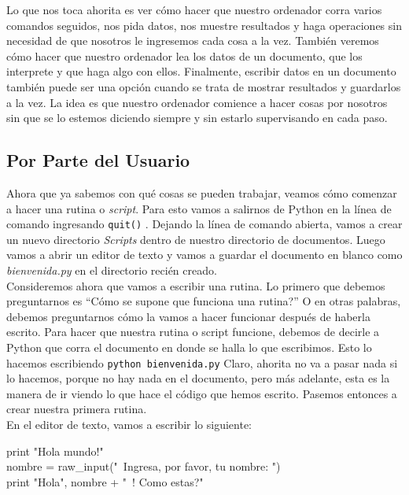 \documentclass[10pt,letterpaper]{article}
\newcommand{\inlinecode}[1]{
\colorbox{light-gray}{\texttt{#1}}
}
\newenvironment{Code}
{
\begin{lrbox}{\selvestebox}%
\begin{minipage}{\dimexpr\columnwidth-2\fboxsep\relax}
\fontfamily{\ttdefault}\selectfont
}
{\end{minipage}\end{lrbox}%
\begin{center}
\colorbox{light-gray}{\usebox{\selvestebox}}
\end{center}
}
\begin{document}
Lo que nos toca ahorita es ver c\'omo hacer que nuestro ordenador corra varios comandos seguidos, nos pida datos, nos muestre resultados y haga operaciones sin necesidad de que nosotros le ingresemos cada cosa a la vez. Tambi\'en veremos c\'omo hacer que nuestro ordenador lea los datos de un documento, que los interprete y que haga algo con ellos. Finalmente, escribir datos en un documento tambi\'en puede ser una opci\'on cuando se trata de mostrar resultados y guardarlos a la vez. La idea es que nuestro ordenador comience a hacer cosas por nosotros sin que se lo estemos diciendo siempre y sin estarlo supervisando en cada paso.

\subsection{Por Parte del Usuario}
Ahora que ya sabemos con qu\'e cosas se pueden trabajar, veamos c\'omo comenzar a hacer una rutina o \textit{script}. Para esto vamos a salirnos de Python en la l\'inea de comando ingresando \inlinecode{quit()}. Dejando la l\'inea de comando abierta, vamos a crear un nuevo directorio \textit{Scripts} dentro de nuestro directorio de documentos. Luego vamos a abrir un editor de texto y vamos a guardar el documento en blanco como \textit{bienvenida.py} en el directorio reci\'en creado.\\

Consideremos ahora que vamos a escribir una rutina. Lo primero que debemos preguntarnos es ``C\'omo se supone que funciona una rutina?'' O en otras palabras, debemos preguntarnos c\'omo la vamos a hacer funcionar despu\'es de haberla escrito. Para hacer que nuestra rutina o script funcione, debemos de decirle a Python que corra el documento en donde se halla lo que escribimos. Esto lo hacemos escribiendo \inlinecode{python bienvenida.py} Claro, ahorita no va a pasar nada si lo hacemos, porque no hay nada en el documento, pero m\'as adelante, esta es la manera de ir viendo lo que hace el c\'odigo que hemos escrito. Pasemos entonces a crear nuestra primera rutina.\\

En el editor de texto, vamos a escribir lo siguiente:

\begin{Code}
print "Hola mundo!"\\
nombre = raw\_input("\ \hspace{-2mm}Ingresa, por favor, tu nombre: ")\\
print "Hola", nombre + "\ \hspace{-2mm}! Como estas?"
\end{Code}
\end{document}
